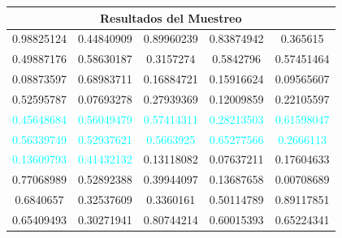\documentclass[12pt,a4paper]{article}
\begin{document}
{{            \begin{center}
                \begin{tabular}{ccccc}
                        \multicolumn{5}{c}{Resultados del Muestreo} \\ 
                    \midrule
                        \textcolor{Mulberry}{0.98825124} & \textcolor{Mulberry}{0.44840909} & \textcolor{Mulberry}{0.89960239} & \textcolor{Mulberry}{0.83874942} & \textcolor{Mulberry}{0.365615}   \\
                        \textcolor{Mulberry}{0.49887176} & \textcolor{Mulberry}{0.58630187} & \textcolor{Mulberry}{0.3157274}  & \textcolor{Mulberry}{0.5842796}  & \textcolor{Mulberry}{0.57451464} \\
                        \textcolor{BurntOrange}{0.08873597} & \textcolor{BurntOrange}{0.68983711} & \textcolor{BurntOrange}{0.16884721} & \textcolor{BurntOrange}{0.15916624} & \textcolor{BurntOrange}{0.09565607} \\
                        \textcolor{BurntOrange}{0.52595787} & \textcolor{BurntOrange}{0.07693278} & \textcolor{BurntOrange}{0.27939369} & \textcolor{BurntOrange}{0.12009859} & \textcolor{BurntOrange}{0.22105597} \\
                        \textcolor{Cyan}{0.45648684} & \textcolor{Cyan}{0.56049479} & \textcolor{Cyan}{0.57414311} & \textcolor{Cyan}{0.28213503} & \textcolor{Cyan}{0.61598047} \\
                        \textcolor{Cyan}{0.56339749} & \textcolor{Cyan}{0.52937621} & \textcolor{Cyan}{0.5663925}  & \textcolor{Cyan}{0.65277566} & \textcolor{Cyan}{0.2666113}  \\
                        \textcolor{Cyan}{0.13609793}     & \textcolor{Cyan}{0.41432132}     & \textcolor{Mahogany}{0.13118082} & \textcolor{Mahogany}{0.07637211} & \textcolor{Mahogany}{0.17604633} \\
                        \textcolor{Mahogany}{0.77068989} & \textcolor{Mahogany}{0.52892388} & \textcolor{Mahogany}{0.39944097} & \textcolor{Mahogany}{0.13687658} & \textcolor{Mahogany}{0.00708689} \\
                        \textcolor{PineGreen}{0.6840657}  & \textcolor{PineGreen}{0.32537609} & \textcolor{PineGreen}{0.3360161}  & \textcolor{PineGreen}{0.50114789} & \textcolor{PineGreen}{0.89117851} \\
                        \textcolor{PineGreen}{0.65409493} & \textcolor{PineGreen}{0.30271941} & \textcolor{PineGreen}{0.80744214} & \textcolor{PineGreen}{0.60015393} & \textcolor{PineGreen}{0.65224341} \\
                \end{tabular}
            \end{center}

}}
\end{document}
